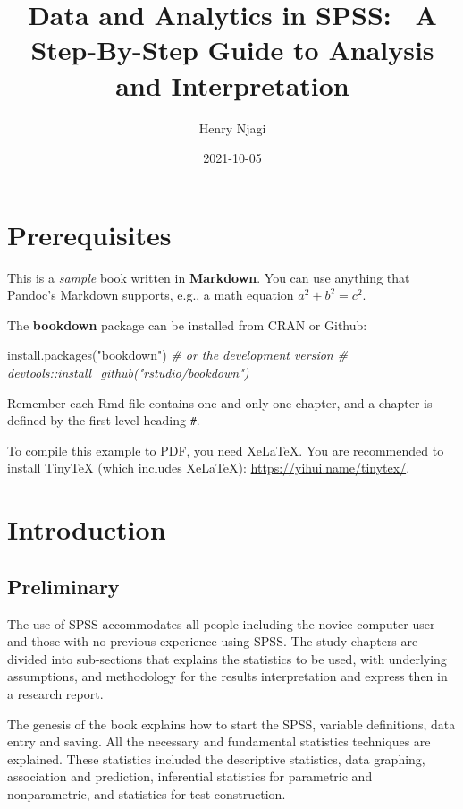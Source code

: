 \documentclass[
]{book}
\title{Data and Analytics in SPSS: ~A Step-By-Step Guide to Analysis and Interpretation}
\author{Henry Njagi}
\date{2021-10-05}
\newenvironment{Shaded}{\begin{snugshade}}{\end{snugshade}}
\newcommand{\CommentTok}[1]{\textcolor[rgb]{0.56,0.35,0.01}{\textit{#1}}}
\newcommand{\FunctionTok}[1]{\textcolor[rgb]{0.00,0.00,0.00}{#1}}
\newcommand{\NormalTok}[1]{#1}
\newcommand{\StringTok}[1]{\textcolor[rgb]{0.31,0.60,0.02}{#1}}
\begin{document}
\maketitle

{
\setcounter{tocdepth}{1}
\tableofcontents
}
\hypertarget{prerequisites}{%
\chapter{Prerequisites}\label{prerequisites}}

This is a \emph{sample} book written in \textbf{Markdown}. You can use anything that Pandoc's Markdown supports, e.g., a math equation \(a^2 + b^2 = c^2\).

The \textbf{bookdown} package can be installed from CRAN or Github:

\begin{Shaded}
\begin{Highlighting}[]
\FunctionTok{install.packages}\NormalTok{(}\StringTok{"bookdown"}\NormalTok{)}
\CommentTok{\# or the development version}
\CommentTok{\# devtools::install\_github("rstudio/bookdown")}
\end{Highlighting}
\end{Shaded}

Remember each Rmd file contains one and only one chapter, and a chapter is defined by the first-level heading \texttt{\#}.

To compile this example to PDF, you need XeLaTeX. You are recommended to install TinyTeX (which includes XeLaTeX): \url{https://yihui.name/tinytex/}.

\hypertarget{intro}{%
\chapter{Introduction}\label{intro}}

\hypertarget{preliminary}{%
\section{Preliminary}\label{preliminary}}

The use of SPSS accommodates all people including the novice computer user and those with no previous experience using SPSS. The study chapters are divided into sub-sections that explains the statistics to be used, with underlying assumptions, and methodology for the results interpretation and express then in a research report.

The genesis of the book explains how to start the SPSS, variable definitions, data entry and saving. All the necessary and fundamental statistics techniques are explained. These statistics included the descriptive statistics, data graphing, association and prediction, inferential statistics for parametric and nonparametric, and statistics for test construction.
\end{document}
